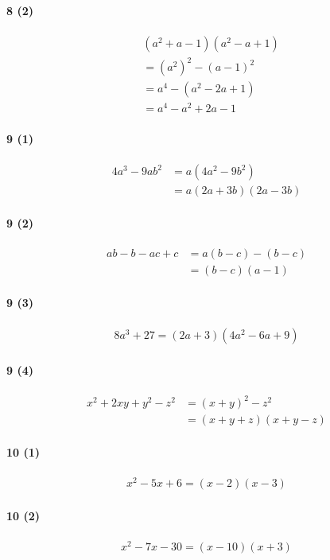 \documentclass[fleqn,a4j,dvipdfmx,uplatex,twocolumn]{jsarticle}
\begin{document}
\paragraph{8 (2)}
\begin{align*}
  &  (a^{2}+a-1)(a^{2}-a+1) \\
  &= (a^{2})^{2}-(a-1)^{2} \\
  &= a^{4}-(a^{2}-2a+1) \\
  &= a^{4}-a^{2}+2a-1
\end{align*}

\paragraph{9 (1)}
\begin{align*}
  4a^{3}-9ab^{2} &= a(4a^{2}-9b^{2}) \\
  &= a(2a+3b)(2a-3b)
\end{align*}

\paragraph{9 (2)}
\begin{align*}
  ab-b-ac+c &= a(b-c)-(b-c) \\
  &= (b-c)(a-1)
\end{align*}

\paragraph{9 (3)}
\begin{align*}
  8a^{3}+27 = (2a+3)(4a^{2}-6a+9)
\end{align*}

\paragraph{9 (4)}
\begin{align*}
  x^{2}+2xy+y^{2}-z^{2} &= (x+y)^{2}-z^{2} \\
  &= (x+y+z)(x+y-z)
\end{align*}

\paragraph{10 (1)}
\begin{align*}
  x^{2}-5 x+6 = (x-2)(x-3)
\end{align*}

\paragraph{10 (2)}
\begin{align*}
  x^{2}-7 x-30 = (x-10)(x+3)
\end{align*}
\end{document}
